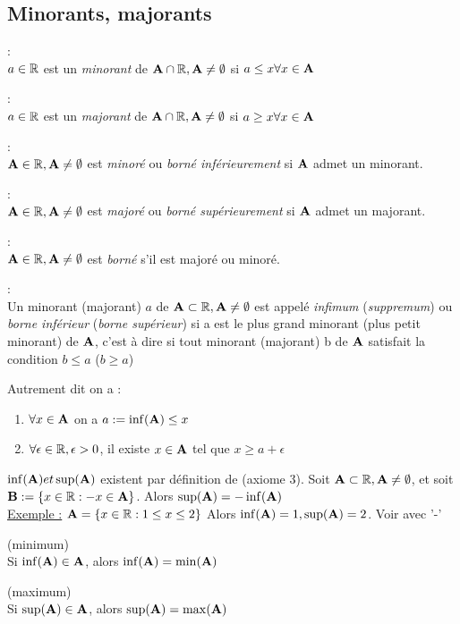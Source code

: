 \documentclass[12pt,a4paper]{article}
\begin{document}
\subsection{Minorants, majorants}
\begin{boite}
	\Definition :\\
	$a\in \mathbb{R}$ est un \textit{minorant} de $\mathbf{A} \cap \mathbb{R}, \mathbf{A}\neq \emptyset$ si $a \leq x \forall x \in \mathbf{A}$
\end{boite}
\begin{boite}
	\Definition :\\
	$a\in \mathbb{R}$ est un \textit{majorant} de $\mathbf{A} \cap \mathbb{R}, \mathbf{A}\neq \emptyset$ si $a \geq x \forall x \in \mathbf{A}$
\end{boite}
\begin{boite}
	\Definition :\\
	$\mathbf{A} \in \mathbb{R}, \mathbf{A} \neq \emptyset$ est \textit{minoré} ou \textit{borné  inférieurement} si $\mathbf{A}$ admet un minorant.
\end{boite}
\begin{boite}
	\Definition :\\
	$\mathbf{A} \in \mathbb{R}, \mathbf{A} \neq \emptyset$ est \textit{majoré} ou \textit{borné  supérieurement} si $\mathbf{A}$ admet un majorant.
\end{boite}
\begin{boite}
	\Definition :\\
	$\mathbf{A} \in \mathbb{R}, \mathbf{A} \neq \emptyset$ est \textit{borné} s'il est majoré ou minoré.
\end{boite}
\begin{boite}
	\Definition :\\
	Un minorant (majorant) $a$ de $\mathbf{A} \subset \mathbb{R}, \mathbf{A} \neq \emptyset$ est appelé \textit{infimum} (\textit{suppremum}) ou \textit{borne inférieur} (\textit{borne supérieur}) si a est le plus grand minorant (plus petit minorant) de $\mathbf{A}$, c'est à dire si tout minorant (majorant) b de $\mathbf{A}$ satisfait la condition $b \leq a$ ($b \geq a$)
\end{boite}
Autrement dit on a :
\begin{enumerate}
	\item $\forall x \in \mathbf{A}$ on a $a := \inf(\mathbf{A}) \leq x$
	\item $\forall \epsilon \in \mathbb{R}, \epsilon > 0$, il existe $x \in \mathbf{A}$ tel que $x \geq a+\epsilon$
\end{enumerate}
 $\inf(\mathbf{A}) et \sup(\mathbf{A})$ existent par définition de \R (axiome 3).
 Soit $\mathbf{A} \subset \mathbb{R}, \mathbf{A} \neq \emptyset$, et soit $\mathbf{B} :=\{x\in\mathbb{R} : -x \in \mathbf{A}\}$. Alors $\sup(\mathbf{A}) = -\inf(\mathbf{A})$\\
\underline{Exemple :}  $\mathbf{A} = \{x \in \mathbb{R} :  1\leq x \leq 2\}$ Alors $\inf(\mathbf{A}) = 1, \sup(\mathbf{A}) = 2$. Voir avec '-\A'
\begin{boite}[0.5]
\Definition (minimum)\\
Si $\inf(\mathbf{A}) \in \mathbf{A}$, alors $\inf(\mathbf{A}) = \min(\mathbf{A})$
\end{boite}
\begin{boite}[0.55]
\Definition (maximum)\\
Si $\sup(\mathbf{A}) \in \mathbf{A}$, alors $\sup(\mathbf{A}) = \max(\mathbf{A})$
\end{boite}
\end{document}
